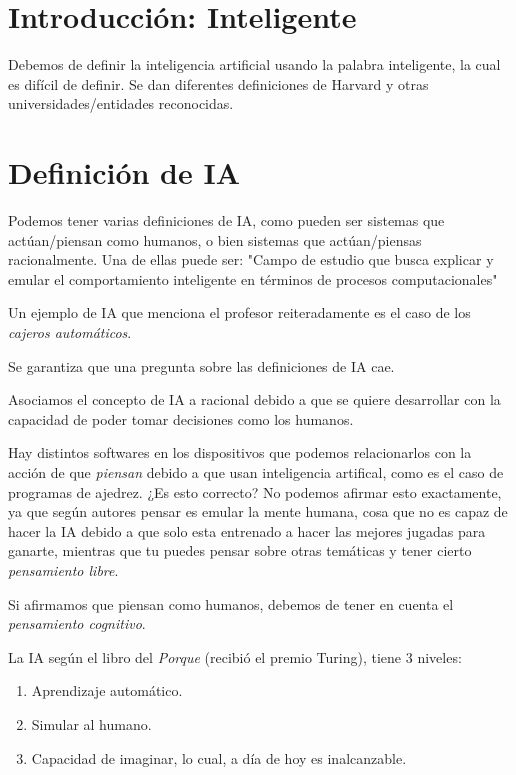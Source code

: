 \section{Introducción: Inteligente}
Debemos de definir la inteligencia artificial
usando la palabra inteligente, la cual es difícil de definir. Se dan diferentes definiciones de Harvard y otras universidades/entidades reconocidas. 

\section{Definición de IA}

Podemos tener varias definiciones de IA, como pueden ser sistemas que actúan/piensan como humanos, o bien sistemas que actúan/piensas racionalmente. Una de ellas puede ser: "Campo de estudio que busca explicar y emular el comportamiento inteligente en términos de procesos computacionales"

Un ejemplo de IA que menciona el profesor reiteradamente es el caso de los \textit{cajeros automáticos}.

\begin{tcolorbox}[colback=blue!20, colframe=blue]
Se garantiza que una pregunta sobre las definiciones de IA cae.
    
\end{tcolorbox}

Asociamos el concepto de IA a racional debido a que se quiere desarrollar con la capacidad de poder tomar decisiones como los humanos.

Hay distintos softwares en los dispositivos que podemos relacionarlos con la acción de que \textit{piensan} debido a que usan inteligencia artifical, como es el caso de programas de ajedrez. ¿Es esto correcto? No podemos afirmar esto exactamente, ya que según autores pensar es emular la mente humana, cosa que no es capaz de hacer la IA debido a que solo esta entrenado a hacer las mejores jugadas para ganarte, mientras que tu puedes pensar sobre otras temáticas y tener cierto \textit{pensamiento libre}.

Si afirmamos que piensan como humanos, debemos de tener en cuenta el \textit{pensamiento cognitivo}.

La IA según el libro del \textit{Porque} (recibió el premio Turing), tiene 3 niveles:
\begin{enumerate}
    \item Aprendizaje automático.
    \item Simular al humano.
    \item Capacidad de imaginar, lo cual, a día de hoy es inalcanzable.
\end{enumerate}

